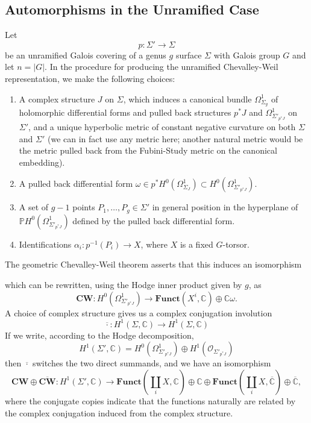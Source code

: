 \documentclass[11pt]{amsart}
\numberwithin{thm}{section}
\begin{document}
\subsection{Automorphisms in the Unramified Case}
Let \[p: \Sigma'\rightarrow \Sigma\] be an unramified Galois covering of a genus $g$ surface $\Sigma$ with Galois group $G$ and let $n = |G|$.  In the procedure for producing the unramified Chevalley-Weil representation, we make the following choices:
\begin{enumerate}
\item A complex structure $J$ on $\Sigma$, which induces a canonical bundle $\Omega^1_{\Sigma_g}$ of holomorphic differential forms and pulled back structures $p^*J$ and $\Omega^1_{\Sigma'_{p^*J}}$ on $\Sigma'$, and a unique hyperbolic metric of constant negative curvature on both $\Sigma$ and $\Sigma'$ (we can in fact use any metric here; another natural metric would be the metric pulled back from the Fubini-Study metric on the canonical embedding).
\item A pulled back differential form $\omega\in p^*H^0(\Omega^1_{\Sigma_J}) \subset H^0(\Omega^1_{\Sigma'_{p^*J}})$.
\item A set of $g-1$ points $P_1, \dots, P_g \in \Sigma'$ in general position in the hyperplane of $\mathbb{P}H^0(\Omega^1_{\Sigma'_{p^*J}})$ defined by the pulled back differential form.
\item Identifications $\alpha_i: p^{-1}(P_i) \rightarrow X$, where $X$ is a fixed $G$-torsor.
\end{enumerate} 
The geometric Chevalley-Weil theorem asserts that this induces an isomorphism
\begin{center}
\mbox{}
\end{center}
which can be rewritten, using the Hodge inner product given by $g$, as
\[
\mathbf{CW}: H^0(\Omega^1_{\Sigma'_{p^*J}}) \rightarrow \mathbf{Funct}(X^i, \mathbb{C}) \oplus \mathbb{C}\omega.
\]
A choice of complex structure gives us a complex conjugation involution
\[
\overline{\cdot}: H^1(\Sigma, \mathbb{C}) \rightarrow H^1(\Sigma, \mathbb{C})
\]
If we write, according to the Hodge decomposition,
\[
H^1(\Sigma', \mathbb{C}) = H^0(\Omega^1_{\Sigma'_{p^*J}}) \oplus H^1(\mathcal{O}_{\Sigma'_{p^*J}})
\]
then $\overline{\cdot}$ switches the two direct summands, and we have an isomorphism
\[
\mathbf{CW} \oplus \overline{\mathbf{CW}}: H^1(\Sigma', \mathbb{C})\rightarrow \mathbf{Funct}(\coprod_i X, \mathbb{C}) \oplus  \mathbb{C} \oplus \mathbf{Funct}(\coprod_i X, \overline{\mathbb{C}}) \oplus \overline{\mathbb{C}},
\]
where the conjugate copies indicate that the functions naturally are related by the complex conjugation induced from the complex structure.
\end{document}
